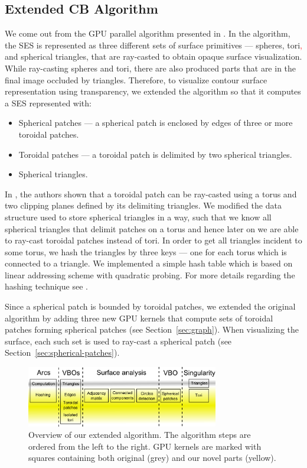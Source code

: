 \subsection{Extended CB Algorithm}

We come out from the GPU parallel algorithm presented in \cite{krone2011parallel}.
In the algorithm, the SES is represented as three different sets of surface primitives --- spheres, tori\textcolor{red}{,} and spherical triangles, that are ray-casted to obtain opaque surface visualization.
While ray-casting spheres and tori, there are also produced parts that are in the final image occluded by triangles.
Therefore, to visualize contour surface representation using transparency, we extended the algorithm so that it computes a SES represented with:
\begin{itemize}
  \item Spherical patches --- a spherical patch is enclosed by edges of three or more toroidal patches.
	\item Toroidal patches --- a toroidal patch is delimited by two spherical triangles.
	\item Spherical triangles.
\end{itemize}

In \cite{kauker2013rendering}, the authors shown that a toroidal patch can be ray-casted using a torus and two clipping planes defined by its delimiting triangles.
We modified the data structure used to store spherical triangles in a way, such that we know all spherical triangles that delimit patches on a torus and hence later on we are able to ray-cast toroidal patches instead of tori.
In order to get all triangles incident to some torus, we hash the triangles by three keys --- one for each torus which is connected to a triangle.
We implemented a simple hash table which is based on linear addressing scheme with quadratic probing.
For more details regarding the hashing technique see \cite{alcantara2011efficient}.

Since a spherical patch is bounded by toroidal patches, we extended the original algorithm by adding three new GPU kernels that compute sets of toroidal patches forming spherical patches (see Section~\ref{sec:graph}).
When visualizing the surface, each such set is used to ray-cast a spherical patch (see Section~\ref{sec:spherical-patches}).

\begin{figure}[htb]
  \centering
  \includegraphics[width=3.3in]{image/kernels.png}
  \caption{Overview of our extended algorithm.
	The algorithm steps are ordered from the left to the right.
	GPU kernels are marked with squares containing both original (grey) and our novel parts (yellow).}
	\label{fig:kernels}
\end{figure}

